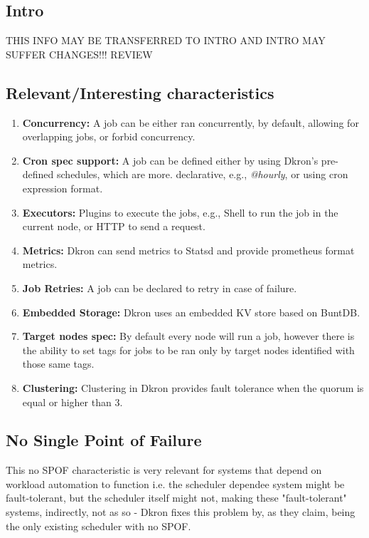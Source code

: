 \documentclass[runningheads]{llncs}
\begin{document}
\subsection{Intro}
THIS INFO MAY BE TRANSFERRED TO INTRO AND INTRO MAY SUFFER CHANGES!!! REVIEW

\subsection{Relevant/Interesting characteristics}
\begin{enumerate}
    \item \textbf{Concurrency:} A job can be either ran concurrently, by default,
    allowing for overlapping jobs, or forbid concurrency.
    \item \textbf{Cron spec support:} A job can be defined either by using Dkron's
    pre-defined schedules, which are more.
    declarative, e.g., \textit{@hourly}, or using cron expression format.
    \item \textbf{Executors:} Plugins to execute the jobs, e.g., Shell to run the job in
    the current node, or HTTP to send a request.
    \item \textbf{Metrics:} Dkron can send metrics to Statsd and provide prometheus format metrics.
    \item \textbf{Job Retries:} A job can be declared to retry in case of failure.
    \item \textbf{Embedded Storage:} Dkron uses an embedded KV store based on BuntDB.
    \item \textbf{Target nodes spec:} By default every node will run a job, however there is
    the ability to set tags for jobs to be ran only by target nodes identified with those
    same tags.
    \item \textbf{Clustering:} Clustering in Dkron provides fault tolerance when the
    quorum is equal or higher than 3.
\end{enumerate}

\subsection{No Single Point of Failure}
This no SPOF characteristic is very relevant for systems that depend on workload automation to function i.e. the scheduler dependee
system might be fault-tolerant, but the scheduler itself might not, making these "fault-tolerant" systems, indirectly, not as
so - Dkron fixes this problem by, as they claim, being the only existing scheduler with no SPOF. %
\end{document}
